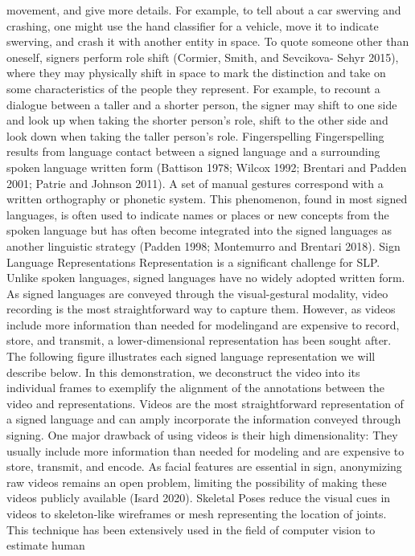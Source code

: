 movement, and give more details. For example, to tell about a car swerving and crashing, one
might use the hand classifier for a vehicle, move it to indicate swerving, and crash it with another
entity in space.
To quote someone other than oneself, signers perform role shift (Cormier, Smith, and Sevcikova-
Sehyr 2015), where they may physically shift in space to mark the distinction and take on some
characteristics of the people they represent. For example, to recount a dialogue between a taller
and a shorter person, the signer may shift to one side and look up when taking the shorter person’s
role, shift to the other side and look down when taking the taller person’s role.
Fingerspelling
Fingerspelling results from language contact between a signed language and a surrounding spoken
language written form (Battison 1978; Wilcox 1992; Brentari and Padden 2001; Patrie and
Johnson 2011). A set of manual gestures correspond with a written orthography or phonetic
system. This phenomenon, found in most signed languages, is often used to indicate names or
places or new concepts from the spoken language but has often become integrated into the signed
languages as another linguistic strategy (Padden 1998; Montemurro and Brentari 2018).
Sign Language Representations
Representation is a significant challenge for SLP. Unlike spoken languages, signed
languages have no widely adopted written form. As signed languages are conveyed
through the visual-gestural modality, video recording is the most straightforward way to
capture them. However, as videos include more information than needed for modelingand are expensive to record, store, and transmit, a lower-dimensional representation has
been sought after.
The following figure illustrates each signed language representation we will describe
below. In this demonstration, we deconstruct the video into its individual frames to
exemplify the alignment of the annotations between the video and representations.
Videos
are the most straightforward representation of a signed language and can amply incorporate the
information conveyed through signing. One major drawback of using videos is their high
dimensionality: They usually include more information than needed for modeling and are
expensive to store, transmit, and encode. As facial features are essential in sign, anonymizing raw
videos remains an open problem, limiting the possibility of making these videos publicly
available (Isard 2020).
Skeletal Poses
reduce the visual cues in videos to skeleton-like wireframes or mesh representing the location of
joints. This technique has been extensively used in the field of computer vision to estimate human

